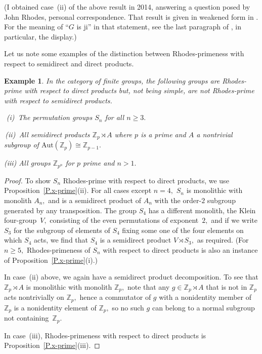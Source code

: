 \documentclass{amsart}
\newtheorem{example}[theorem]{Example}
\numberwithin{equation}{section}
\numberwithin{theorem}{section}
\newcommand{\Z}{\mathbb{Z}}
\begin{document}
(I obtained case~(ii) of the above result in 2014, answering a
question posed by John Rhodes, personal correspondence.
That result is given in weakened form in
\cite[Theorem~4.20, p.\,1275]{LRS}.
For the meaning of
``\!$G$ is ji''
in that statement, see the last paragraph of
\cite[p.\,1252]{LRS}, in particular, the display.)

Let us note some examples of the distinction between
Rhodes-primeness with respect to semidirect and direct products.

\begin{example}\label{E.S3}
In the category of finite groups, the following groups
are Rhodes-prime with respect to direct
products but, not being simple, are not
Rhodes-prime with respect to semidirect products.

\,\,{\rm(i)}\, The permutation groups $S_n$ for all $n\geq 3.$

\,{\rm(ii)}\, All semidirect products $\Z_p\rtimes A$ where
$p$ is a prime and $A$ a nontrivial subgroup of
$\mathrm{Aut}(\Z_p)\cong\Z_{p-1}.$

{\rm(iii)} All groups $\Z_{p^n}$ for $p$ prime and $n>1.$
\end{example}

\begin{proof}
To show $S_n$ Rhodes-prime with respect to direct
products, we use Proposition~\ref{P.x-prime}(ii).
For all cases except $n=4,$ $S_n$ is monolithic with monolith $A_n,$
and is a semidirect product of $A_n$ with the order-$\!2\!$
subgroup generated by any transposition.
The group $S_4$ has a different monolith,
the Klein four-group~$V,$ consisting of the even permutations of
exponent~$2,$ and if we write $S_3$ for the subgroup of elements of
$S_4$ fixing some one of the four elements on which $S_4$
acts, we find that $S_4$ is
a semidirect product $V\rtimes S_3,$ as required.
(For $n\geq 5,$ Rhodes-primeness of $S_n$
with respect to direct products is also an instance
of Proposition~\ref{P.x-prime}(i).)

In case~(ii) above, we again have a semidirect product decomposition.
To see that $\Z_p\rtimes A$ is monolithic with monolith $\Z_p,$
note that any $g\in\Z_p\rtimes A$ that is
not in $\Z_p$ acts nontrivially on $\Z_p,$
hence a commutator of $g$ with a nonidentity member of $\Z_p$ is a
nonidentity element of $\Z_p,$ so no
such $g$ can belong to a normal subgroup not containing~$\Z_p.$

In case~(iii), Rhodes-primeness with respect to direct products
is Proposition~\ref{P.x-prime}(iii).
\end{proof}
\end{document}
